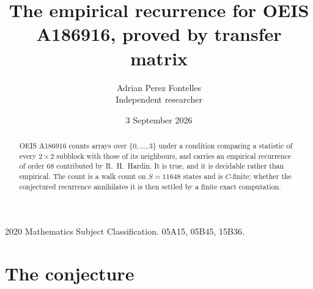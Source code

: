 \documentclass[11pt,a4paper]{article}
\title{The empirical recurrence for OEIS A186916, proved by transfer matrix}
\author{Adrian Perez Fontelles\\ \small Independent researcher}
\date{3 September 2026}
\theoremstyle{plain}
\theoremstyle{definition}
\begin{document}
\maketitle

\begin{abstract}
OEIS A186916 counts arrays over $\{0,\dots,3\}$ under a condition comparing a statistic of
every $2\times2$ subblock with those of its neighbours, and carries an empirical recurrence
of order $68$ contributed by R.~H.~Hardin. It is true, and it is decidable rather than
empirical. The count is a walk count on $S=11648$ states and is $C$-finite; whether the
conjectured recurrence annihilates it is then settled by a finite exact computation.
\end{abstract}

\noindent\small 2020 Mathematics Subject Classification. 05A15, 05B45, 15B36.\normalsize

\section{The conjecture}
\end{document}
